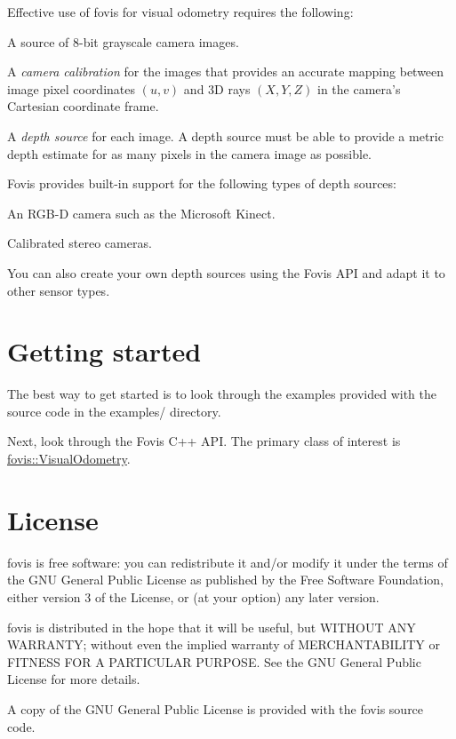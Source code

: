 Effective use of fovis for visual odometry requires the following: \begin{DoxyItemize}
\item A source of 8-\/bit grayscale camera images. \item A {\itshape camera calibration\/} for the images that provides an accurate mapping between image pixel coordinates $(u, v)$ and 3D rays $(X, Y, Z)$ in the camera's Cartesian coordinate frame. \item A {\itshape depth source\/} for each image. A depth source must be able to provide a metric depth estimate for as many pixels in the camera image as possible.\end{DoxyItemize}
Fovis provides built-\/in support for the following types of depth sources: \begin{DoxyItemize}
\item An RGB-\/D camera such as the Microsoft Kinect. \item Calibrated stereo cameras.\end{DoxyItemize}
You can also create your own depth sources using the Fovis API and adapt it to other sensor types.\hypertarget{index_getting_started}{}\section{Getting started}\label{index_getting_started}
The best way to get started is to look through the examples provided with the source code in the {\ttfamily examples/} directory.

Next, look through the Fovis C++ API. The primary class of interest is \hyperlink{classfovis_1_1VisualOdometry}{fovis::VisualOdometry}.\hypertarget{index_license}{}\section{License}\label{index_license}
fovis is free software: you can redistribute it and/or modify it under the terms of the GNU General Public License as published by the Free Software Foundation, either version 3 of the License, or (at your option) any later version.

fovis is distributed in the hope that it will be useful, but WITHOUT ANY WARRANTY; without even the implied warranty of MERCHANTABILITY or FITNESS FOR A PARTICULAR PURPOSE. See the GNU General Public License for more details.

A copy of the GNU General Public License is provided with the fovis source code. 